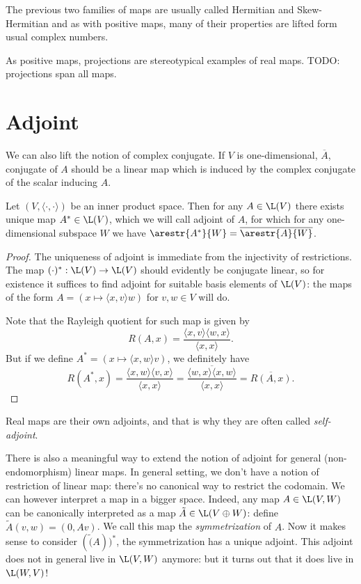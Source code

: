The previous two families of maps are usually called Hermitian and Skew-Hermitian and as with positive maps, many of their properties are lifted form usual complex numbers.

As positive maps, projections are stereotypical examples of real maps. TODO: projections span all maps.

\section{Adjoint}

We can also lift the notion of complex conjugate. If $V$ is one-dimensional, $\overline{A}$, conjugate of $A$ should be a linear map which is induced by the complex conjugate of the scalar inducing $A$.

\begin{lause}
	Let $(V, \langle \cdot, \cdot \rangle)$ be an inner product space. Then for any $A \in \L(V)$ there exists unique map $A^{*} \in \L(V)$, which we will call adjoint of $A$, for which for any one-dimensional subspace $W$ we have $\arestr{A^{*}}{W} = \overline{\arestr{A}{W}}$.
\end{lause}
\begin{proof}
	The uniqueness of adjoint is immediate from the injectivity of restrictions. The map $(\cdot)^{*} : \L(V) \to \L(V)$ should evidently be conjugate linear, so for existence it suffices to find adjoint for suitable basis elements of $\L(V)$: the maps of the form $A = (x \mapsto \langle x, v \rangle w)$ for $v, w \in V$ will do.

	Note that the Rayleigh quotient for such map is given by
	\[
		R(A, x) = \frac{\langle x, v \rangle \langle w, x \rangle}{\langle x, x \rangle}.
	\]
	But if we define $A^{*} = (x \mapsto \langle x, w \rangle v)$, we definitely have
	\[
		R(A^{*}, x) = \frac{\langle x, w \rangle \langle v, x \rangle}{\langle x, x \rangle} = \overline{\frac{\langle w, x \rangle \langle x, w \rangle}{\langle x, x \rangle}} = \overline{R(A, x)}.
	\]
\end{proof}

Real maps are their own adjoints, and that is why they are often called \textit{self-adjoint}.

There is also a meaningful way to extend the notion of adjoint for general (non-endomorphism) linear maps. In general setting, we don't have a notion of restriction of linear map: there's no canonical way to restrict the codomain. We can however interpret a map in a bigger space. Indeed, any map $A \in \L(V, W)$ can be canonically interpreted as a map $\tilde{A} \in \L(V \oplus W)$: define $\tilde{A}(v, w) = (0, A v)$. We call this map the \textit{symmetrization} of $A$. Now it makes sense to consider $(\tilde(A))^{*}$, the symmetrization has a unique adjoint. This adjoint does not in general live in $\L(V, W)$ anymore: but it turns out that it does live in $\L(W, V)$!


